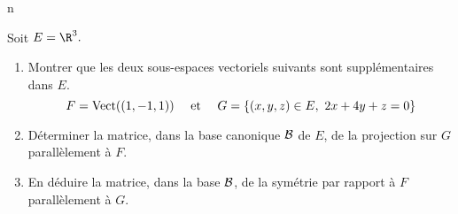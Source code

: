 n\documentclass[a4paper,10pt]{report}
\begin{document}
\begin{Exa} Soit $E=\R^3.$

\begin{enumerate}

\item Montrer que les deux sous-espaces vectoriels suivants sont
suppl\'ementaires dans $E.$
$$F=\hbox{Vect}((1,-1,1))\quad\hbox{ et }\quad G=\{(x,y,z)\in
E,\ 2x+4y+z=0\}$$

\item D\'eterminer la matrice, dans la base canonique ${\cal B}$
de $E$, de la projection sur $G$ parallèlement à $F.$

\item En d\'eduire la matrice, dans la base ${\cal B}$, de la
sym\'etrie par rapport \`a $F$ parallèlement à $G.$
\end{enumerate}
\end{Exa} 

\corr 
\end{document}
